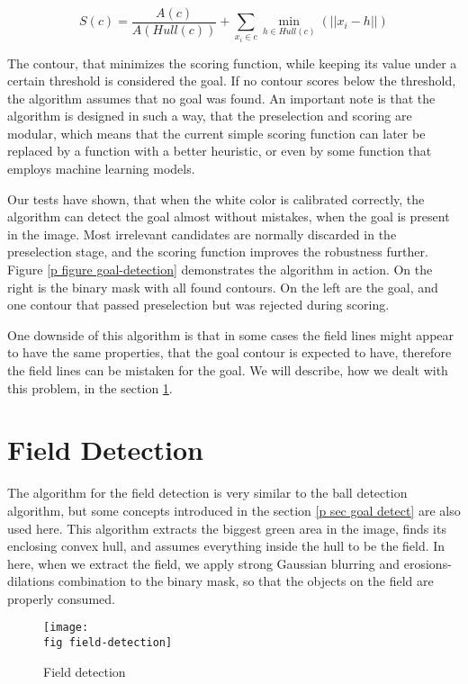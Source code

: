 \begin{equation*}
  S(c)=\frac{A(c)}{A(Hull(c))}+\displaystyle\sum_{x_i \in c}\min_{h \in Hull(c)
  }(||x_i-h||)
\end{equation*}

The contour, that minimizes the scoring function, while keeping its value under
a certain threshold is considered the goal. If no contour scores below the
threshold, the algorithm assumes that no goal was found. An important note
is that the algorithm is designed in such a way, that the preselection and
scoring are modular, which means that the current simple scoring function can
later be replaced by a function with a better heuristic, or even by some
function that employs machine learning models.

Our tests have shown, that when the white color is calibrated correctly, the
algorithm can detect the goal almost without mistakes, when the goal is present
in the image. Most irrelevant candidates are normally discarded in the
preselection stage, and the scoring function improves the robustness further.
Figure \ref{p figure goal-detection} demonstrates the algorithm in action. On
the right is the binary mask with all found contours. On the left are the goal,
and one contour that passed preselection but was rejected during scoring.

One downside of this algorithm is that in some cases the field lines
might appear to have the same properties, that the goal contour is expected to
have, therefore the field lines can be mistaken for the goal. We will describe,
how we dealt with this problem, in the section \ref{p sec field detect}.

\section{Field Detection}
\label{p sec field detect}

The algorithm for the field detection is very similar to the ball detection
algorithm, but some concepts introduced in the section \ref{p sec goal detect}
are also used here. This algorithm extracts the biggest green area in the
image, finds its enclosing convex hull, and assumes everything inside the hull
to be the field. In here, when we extract the field, we apply strong Gaussian
blurring and erosions-dilations combination to the binary mask, so that the
objects on the field are properly consumed.

\begin{figure}[ht]
  \texttt{[image: \\fig field-detection]}
  \caption{Field detection}
  \label{p figure field-detection}
\end{figure}

